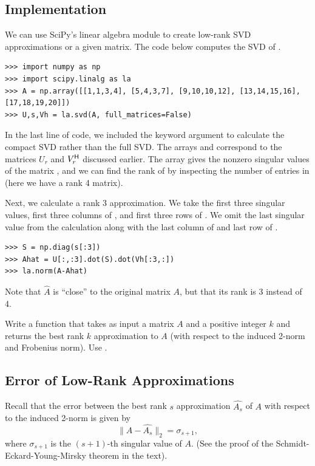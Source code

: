 \subsection*{Implementation}
We can use SciPy's linear algebra module to create low-rank SVD approximations or a given matrix.
The code below computes the SVD of .
\begin{lstlisting}
>>> import numpy as np
>>> import scipy.linalg as la
>>> A = np.array([[1,1,3,4], [5,4,3,7], [9,10,10,12], [13,14,15,16], [17,18,19,20]])
>>> U,s,Vh = la.svd(A, full_matrices=False)
\end{lstlisting}
In the last line of code, we included the keyword argument  to calculate the
compact SVD rather than the full SVD. The arrays  and  correspond to the matrices
$U_r$ and $V_r^{\mathsf H}$ discussed earlier. The array  gives the nonzero singular values
of the matrix , and we can find the rank of  by inspecting the number of entries in  (here we have a rank 4 matrix).

Next, we calculate a rank 3 approximation.
We take the first three singular values, first three columns of , and first three rows of .
We omit the last singular value from the calculation along with the last column of  and last row of .

\begin{lstlisting}
>>> S = np.diag(s[:3])
>>> Ahat = U[:,:3].dot(S).dot(Vh[:3,:])
>>> la.norm(A-Ahat)
\end{lstlisting}
Note that $\widehat A$ is ``close'' to the original matrix $A$, but that its rank is 3 instead of 4.

\begin{problem}
Write a function  that takes as input a matrix $A$ and a positive integer $k$ and returns
the best rank $k$ approximation to $A$ (with respect to the induced 2-norm and Frobenius norm).
Use .
\label{prob:svd_approx}
\end{problem}

\subsection*{Error of Low-Rank Approximations}

Recall that the error between the best rank $s$ approximation $\widehat{A_s}$ of $A$ with respect to the induced 2-norm is given by
$$
\|A - \widehat{A_s}\|_2 = \sigma_{s+1},
$$
where $\sigma_{s+1}$ is the $(s+1)$-th singular value of $A$.
(See the proof of the Schmidt-Eckard-Young-Mirsky theorem in the text).

